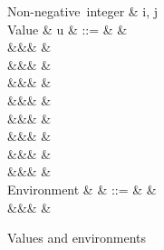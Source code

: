 \begin{figure}[H]
\begin{syntaxfig}
\mbox{Non-negative integer}
&
i, j
\\[2mm]
\mbox{Value}
&
u
&
::=
&
\hole
&
\\
&&&
\annTrue{\alpha} \mid \annFalse{\alpha}
&
\\
&&&
&
\\
&&&
&
\\
&&&
\annNil{\alpha}
&
\\
&&&
&
\\
&&&
&
\\
&&&
\exPrim{\phi}
&
\\
&&&
&
\\[2mm]
\mbox{Environment}
&
\rho
&
::=
&
\envEmpty
&
\\
&&&
&
\end{syntaxfig}
\caption{Values and environments}
\end{figure}
